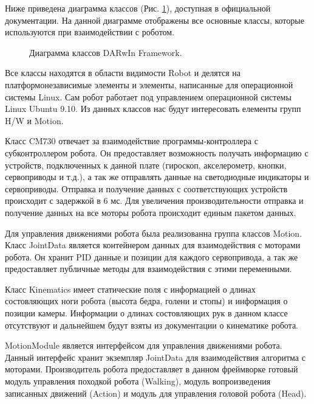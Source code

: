 Ниже приведена диаграмма классов (Рис. \ref{im:1_framework_class_diagram}), доступная в официальной документации. На данной диаграмме отображены все основные классы, которые используются при взаимодействии с роботом. %

\begin{figure}[h]
\caption{Диаграмма классов DARwIn Framework.}
\label{im:1_framework_class_diagram}
\end{figure}

Все классы находятся в области видимости Robot и делятся на платформонезависимые элементы и элементы, написанные для операционной системы Linux. Сам робот работает под управлением операционной системы Linux Ubuntu 9.10. Из данных классов нас будут интересовать елементы групп H/W и Motion.

Класс CM730 отвечает за взаимодействие программы-контроллера с субконтроллером робота. Он предоставляет возможность получать информацию с устройств, подключенных к данной плате (гироскоп, акселерометр, кнопки, сервоприводы и т.д.), а так же отправлять данные на светодиодные индикаторы и сервоприводы. Отправка и получение данных с соответствующих устройств происходит с задержкой в 6 мс. Для увеличения производительности отправка и получение данных на все моторы робота происходит единым пакетом данных.

Для управления движениями робота была реализованна группа классов Motion. Класс JointData является контейнером данных для взаимодействия с моторами робота. Он хранит PID данные и позиции для каждого сервопривода, а так же предоставляет публичные методы для взаимодействия с этими переменными.

Класс Kinematics имеет статические поля с информацией о длинах состовляющих ноги робота (высота бедра, голени и стопы) и информация о позиции камеры. Информации о длинах состовляющих рук в данном классе отсутствуют и дальнейшем будут взяты из документации о кинематике робота. %

MotionModule является интерфейсом для управления движениями робота. Данный интерфейс хранит экземпляр JointData для взаимодействия алгоритма с моторами. Производитель робота предоставляет в данном фреймворке готовый модуль управления походкой робота (Walking), модуль вопроизведения записанных движений (Action) и модуль для управления головой робота (Head).

